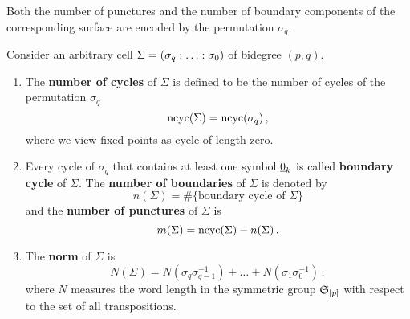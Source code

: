 Both the number of punctures and the number of boundary components of the corresponding surface are encoded by the permutation $\sigma_q$.
\begin{defi}
    \label{cellular_models:parallel:number_cycles}
    \label{cellular_models:parallel:number_punctures}
    \label{cellular_models:parallel:number_boundaries}
    \label{cellular_models:parallel:norm}
    Consider an arbitrary cell $\Sigma = \homogq$ of bidegree $(p,q)$.
    \begin{enumerate}
        \item The {\bf number of cycles} of $\Sigma$ is defined to be the number of cycles of the permutation $\sigma_q$
            \[
                \operatorname{ncyc}( \Sigma ) = \operatorname{ncyc}( \sigma_q) \,,
            \]
            where we view fixed points as cycle of length zero.
        \item Every cycle of $\sigma_q$ that contains at least one symbol $\underline{\smash{0}}_k$ is called {\bf boundary cycle} of $\Sigma$.
            The {\bf number of boundaries} of $\Sigma$ is denoted by
            \[
                n(\Sigma) = \#\{ \text{boundary cycle of } \Sigma\}
            \]
            and the {\bf number of punctures} of $\Sigma$ is
            \[
                m(\Sigma) = \operatorname{ncyc}(\Sigma) - n(\Sigma) \,.
            \]
        \item The {\bf norm} of $\Sigma$ is
            \[
                N(\Sigma) = N(\sigma_q\sigma_{q-1}^{-1}) + \ldots + N(\sigma_1\sigma_0^{-1}) \,,
            \]
            where $N$ measures the word length in the symmetric group $\mathfrak S_{[p]}$ with respect to the set of all transpositions.
    \end{enumerate}
\end{defi}


